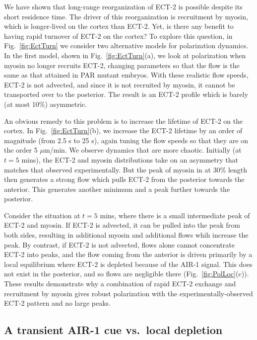 \documentclass[11pt]{article}
\begin{document}
We have shown that long-range reorganization of ECT-2 is possible despite its short residence time. The driver of this reorganization is recruitment by myosin, which is longer-lived on the cortex than ECT-2. Yet, is there any benefit to having rapid turnover of ECT-2 on the cortex? To explore this question, in Fig.\ \ref{fig:EctTurn} we consider two alternative models for polarization dynamics. In the first model, shown in Fig.\ \ref{fig:EctTurn}(a), we look at polarization when myosin no longer recruits ECT-2, changing parameters so that the flow is the same as that attained in PAR mutant embryos. With these realistic flow speeds, ECT-2 is not advected, and since it is not recruited by myosin, it cannot be transported over to the posterior. The result is an ECT-2 profile which is barely (at most 10\%) asymmetric. 

An obvious remedy to this problem is to increase the lifetime of ECT-2 on the cortex. In Fig.\ \ref{fig:EctTurn}(b), we increase the ECT-2 lifetime by an order of magnitude (from 2.5 s to 25 s), again tuning the flow speeds so that they are on the order 5 $\mu$m/min. We observe dynamics that are more chaotic. Initially (at $t=5$ mins), the ECT-2 and myosin distributions take on an asymmetry that matches that observed experimentally. But the peak of myosin in at 30\% length then generates a strong flow which pulls ECT-2 from the posterior towards the anterior. This generates another minimum and a peak further towards the posterior. 

Consider the situation at $t=5$ mins, where there is a small intermediate peak of ECT-2 and myosin. If ECT-2 is advected, it can be pulled into the peak from both sides, resulting in additional myosin and additional flows whih increase the peak. By contrast, if ECT-2 is not advected, flows alone cannot concentrate ECT-2 into peaks, and the flow coming from the anterior is driven primarily by a local equilibrium where ECT-2 is depleted because of the AIR-1 signal. This does not exist in the posterior, and so flows are negligible there (Fig.\ \ref{fig:PolLoc}(c)). These results demonstrate why a combination of rapid ECT-2 exchange and recruitment by myosin gives robust polarization with the experimentally-observed ECT-2 pattern and no large peaks. 

\subsection{A transient AIR-1 cue vs.\ local depletion}
\end{document}
